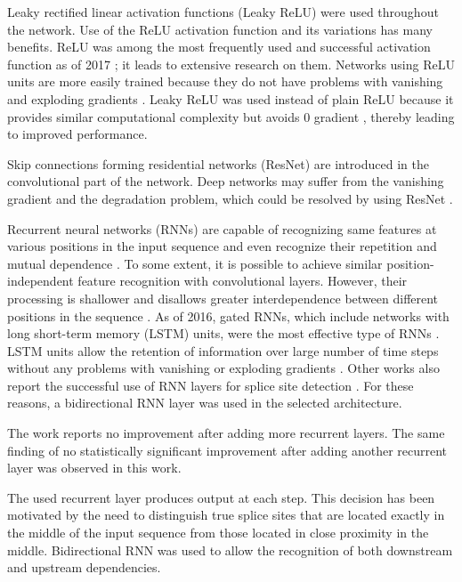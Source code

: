 Leaky rectified linear activation functions (Leaky ReLU) were used throughout
the network. Use of the ReLU activation function and its variations has many
benefits. ReLU was among the most frequently used and successful activation
function as of 2017 \cite{ramachandran2017searching}; it leads to extensive
research on them. Networks using ReLU units are more easily trained because
they do not have problems with vanishing and exploding gradients
\cite{ramachandran2017searching}. Leaky ReLU was used instead of plain ReLU
because it provides similar computational complexity but avoids 0 gradient
\cite{maas2013rectifier}, thereby leading to improved performance.

Skip connections forming residential networks (ResNet) are introduced in the
convolutional part of the network. Deep networks may suffer from the vanishing
gradient and the degradation problem, which could be resolved by using ResNet
\cite{he2016deep}.

Recurrent neural networks (RNNs) are capable of recognizing same features at
various positions in the input sequence and even recognize their repetition and
mutual dependence \cite[p.~367]{goodfellow2016deep}. To some extent, it is
possible to achieve similar position-independent feature recognition with
convolutional layers. However, their processing is shallower and disallows
greater interdependence between different positions in the sequence
\cite[p.~368]{goodfellow2016deep}. As of 2016, gated RNNs, which include
networks with long short-term memory (LSTM) units, were the most effective type
of RNNs \cite[p.~404]{goodfellow2016deep}. LSTM units allow the retention of
information over large number of time steps without any problems with vanishing
or exploding gradients \cite[p.~404]{goodfellow2016deep}. Other works also
report the successful use of RNN layers for splice site detection
\cite{lee2015dna}. For these reasons, a bidirectional RNN layer was used in the
selected architecture.

The work \cite{lee2015dna} reports no improvement after adding more recurrent
layers. The same finding of no statistically significant improvement after
adding another recurrent layer was observed in this work.

The used recurrent layer produces output at each step. This decision has been
motivated by the need to distinguish true splice sites that are located exactly
in the middle of the input sequence from those located in close proximity in
the middle. Bidirectional RNN was used to allow the recognition of both
downstream and upstream dependencies.

